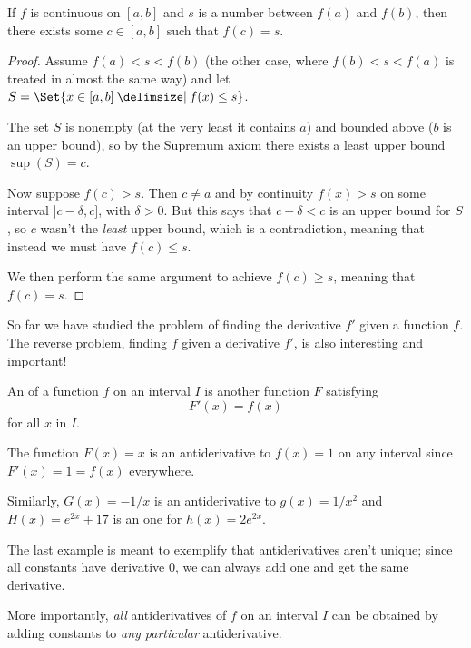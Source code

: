 \begin{theorem}
	If $f$ is continuous on $[a, b]$ and $s$ is a number between $f(a)$ and $f(b)$, then there exists some $c \in [a, b]$ such that $f(c) = s$.
\end{theorem}

\begin{proof}
	Assume $f(a) < s < f(b)$ (the other case, where $f(b) < s < f(a)$ is treated in almost the same way) and let $S = \Set{x \in [a, b] \given f(x) \leq s}$.

	The set $S$ is nonempty (at the very least it contains $a$) and bounded above ($b$ is an upper bound), so by the Supremum axiom there exists a least upper bound $\sup(S) = c$.

	Now suppose $f(c) > s$. Then $c \neq a$ and by continuity $f(x) > s$ on some interval ${]{c - \delta, c}]}$, with $\delta > 0$. But this says that $c - \delta < c$ is an upper bound for $S$, so $c$ wasn't the \emph{least} upper bound, which is a contradiction, meaning that instead we must have $f(c) \leq s$.

	We then perform the same argument to achieve $f(c) \geq s$, meaning that $f(c) = s$.
\end{proof}


So far we have studied the problem of finding the derivative $f'$ given a function $f$. The reverse problem, finding $f$ given a derivative $f'$, is also interesting and important!

\begin{definition}[Antiderivative]
	An  of a function $f$ on an interval $I$ is another function $F$ satisfying
	\[
		F'(x) = f(x)
	\]
	for all $x$ in $I$.
\end{definition}

\begin{example}
	The function $F(x) = x$ is an antiderivative to $f(x) = 1$ on any interval since $F'(x) = 1 = f(x)$ everywhere.

	Similarly, $G(x) = -1/x$ is an antiderivative to $g(x) = 1/x^2$ and $H(x) = e^{2x} + 17$ is an one for $h(x) = 2 e^{2 x}$.
\end{example}

\noindent
The last example is meant to exemplify that antiderivatives aren't unique; since all constants have derivative $0$, we can always add one and get the same derivative.

More importantly, \emph{all} antiderivatives of $f$ on an interval $I$ can be obtained by adding constants to \emph{any particular} antiderivative.

